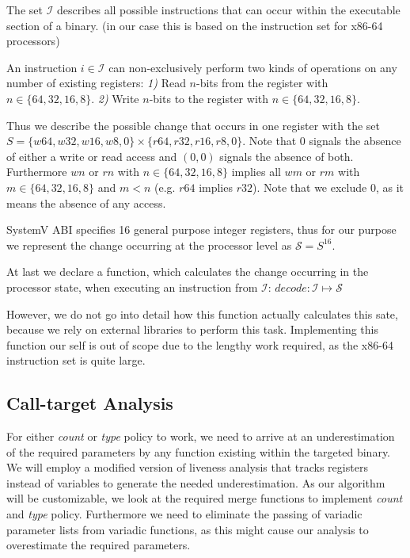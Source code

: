 The set $\mathcal{I}$ describes all possible instructions that can occur within the executable section of a binary. (in our case this is based on the instruction set for x86-64 processors)

An instruction $i \in \mathcal{I}$ can non-exclusively perform two kinds of operations on any number of existing registers:
\textit{1)} Read $n$-bits from the register with $n \in \{ 64, 32, 16, 8 \}$.
\textit{2)} Write $n$-bits to the register with $n \in \{ 64, 32, 16, 8 \}$.

Thus we describe the possible change that occurs in one register with the set $S = \{ w64, w32, w16, w8, 0 \} \times \{r64, r32, r16, r8, 0 \}$. Note that 0 signals the absence of either a write or read access and $(0, 0)$ signals the absence of both. Furthermore $wn$ or $rn$ with $n \in \{64,32,16,8\}$ implies all $wm$ or $rm$ with $m \in \{64,32,16,8\}$ and $m < n$ (e.g. $r64$ implies $r32$). Note that we exclude 0, as it means the absence of any access.

SystemV ABI specifies 16 general purpose integer registers, thus for our purpose we represent the change occurring at the processor level as $\mathcal{S} = S^{16}$.

At last we declare a function, which calculates the change occurring in the processor state, when executing an instruction from $\mathcal{I}$:
$
decode : \mathcal{I} \mapsto \mathcal{S}
$

However, we do not go into detail how this function actually calculates this sate, because we rely on external libraries to perform this task. Implementing this function our self is out of scope due to the lengthy work required, as the x86-64 instruction set is quite large.

\subsection{Call-target Analysis}
\label{section:calltargetanalysis}
For either \emph{count} or \emph{type} policy to work, we need to arrive at an underestimation of the required parameters by any function existing within the targeted 
binary. We will employ a modified version of liveness analysis that tracks registers instead of variables to generate the needed underestimation. As our algorithm will 
be customizable, we look at the required merge functions to implement \emph{count} and \emph{type} policy. Furthermore we need to eliminate the passing of variadic 
parameter lists from variadic functions, as this might cause our analysis to overestimate the required parameters.

